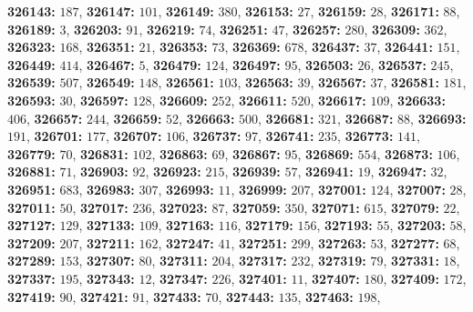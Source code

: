 \textsf{\bfseries 326143:} $187$, \textsf{\bfseries 326147:} $101$, \textsf{\bfseries 326149:} $380$, \textsf{\bfseries 326153:} $27$, \textsf{\bfseries 326159:} $28$, \textsf{\bfseries 326171:} $88$, \textsf{\bfseries 326189:} $3$, \textsf{\bfseries 326203:} $91$, \textsf{\bfseries 326219:} $74$, \textsf{\bfseries 326251:} $47$, \textsf{\bfseries 326257:} $280$, \textsf{\bfseries 326309:} $362$, \textsf{\bfseries 326323:} $168$, \textsf{\bfseries 326351:} $21$, \textsf{\bfseries 326353:} $73$, \textsf{\bfseries 326369:} $678$, \textsf{\bfseries 326437:} $37$, \textsf{\bfseries 326441:} $151$, \textsf{\bfseries 326449:} $414$, \textsf{\bfseries 326467:} $5$, \textsf{\bfseries 326479:} $124$, \textsf{\bfseries 326497:} $95$, \textsf{\bfseries 326503:} $26$, \textsf{\bfseries 326537:} $245$, \textsf{\bfseries 326539:} $507$, \textsf{\bfseries 326549:} $148$, \textsf{\bfseries 326561:} $103$, \textsf{\bfseries 326563:} $39$, \textsf{\bfseries 326567:} $37$, \textsf{\bfseries 326581:} $181$, \textsf{\bfseries 326593:} $30$, \textsf{\bfseries 326597:} $128$, \textsf{\bfseries 326609:} $252$, \textsf{\bfseries 326611:} $520$, \textsf{\bfseries 326617:} $109$, \textsf{\bfseries 326633:} $406$, \textsf{\bfseries 326657:} $244$, \textsf{\bfseries 326659:} $52$, \textsf{\bfseries 326663:} $500$, \textsf{\bfseries 326681:} $321$, \textsf{\bfseries 326687:} $88$, \textsf{\bfseries 326693:} $191$, \textsf{\bfseries 326701:} $177$, \textsf{\bfseries 326707:} $106$, \textsf{\bfseries 326737:} $97$, \textsf{\bfseries 326741:} $235$, \textsf{\bfseries 326773:} $141$, \textsf{\bfseries 326779:} $70$, \textsf{\bfseries 326831:} $102$, \textsf{\bfseries 326863:} $69$, \textsf{\bfseries 326867:} $95$, \textsf{\bfseries 326869:} $554$, \textsf{\bfseries 326873:} $106$, \textsf{\bfseries 326881:} $71$, \textsf{\bfseries 326903:} $92$, \textsf{\bfseries 326923:} $215$, \textsf{\bfseries 326939:} $57$, \textsf{\bfseries 326941:} $19$, \textsf{\bfseries 326947:} $32$, \textsf{\bfseries 326951:} $683$, \textsf{\bfseries 326983:} $307$, \textsf{\bfseries 326993:} $11$, \textsf{\bfseries 326999:} $207$, \textsf{\bfseries 327001:} $124$, \textsf{\bfseries 327007:} $28$, \textsf{\bfseries 327011:} $50$, \textsf{\bfseries 327017:} $236$, \textsf{\bfseries 327023:} $87$, \textsf{\bfseries 327059:} $350$, \textsf{\bfseries 327071:} $615$, \textsf{\bfseries 327079:} $22$, \textsf{\bfseries 327127:} $129$, \textsf{\bfseries 327133:} $109$, \textsf{\bfseries 327163:} $116$, \textsf{\bfseries 327179:} $156$, \textsf{\bfseries 327193:} $55$, \textsf{\bfseries 327203:} $58$, \textsf{\bfseries 327209:} $207$, \textsf{\bfseries 327211:} $162$, \textsf{\bfseries 327247:} $41$, \textsf{\bfseries 327251:} $299$, \textsf{\bfseries 327263:} $53$, \textsf{\bfseries 327277:} $68$, \textsf{\bfseries 327289:} $153$, \textsf{\bfseries 327307:} $80$, \textsf{\bfseries 327311:} $204$, \textsf{\bfseries 327317:} $232$, \textsf{\bfseries 327319:} $79$, \textsf{\bfseries 327331:} $18$, \textsf{\bfseries 327337:} $195$, \textsf{\bfseries 327343:} $12$, \textsf{\bfseries 327347:} $226$, \textsf{\bfseries 327401:} $11$, \textsf{\bfseries 327407:} $180$, \textsf{\bfseries 327409:} $172$, \textsf{\bfseries 327419:} $90$, \textsf{\bfseries 327421:} $91$, \textsf{\bfseries 327433:} $70$, \textsf{\bfseries 327443:} $135$, \textsf{\bfseries 327463:} $198$, 
